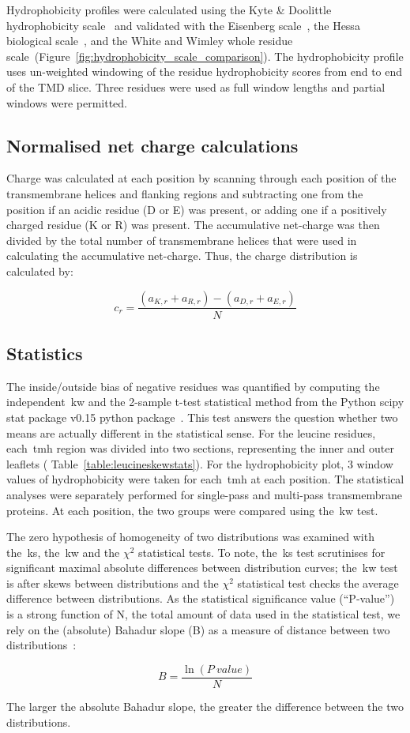 Hydrophobicity profiles were calculated using the Kyte \& Doolittle hydrophobicity scale~\cite{Kyte1982} and validated with the Eisenberg scale~\cite{Eisenberg1984}, the Hessa biological scale~\cite{Hessa2005}, and the White and Wimley whole residue scale~\cite{White1999}(Figure~\ref{fig:hydrophobicity_scale_comparison}).
The hydrophobicity profile uses un-weighted windowing of the residue hydrophobicity scores from end to end of the TMD slice.
Three residues were used as full window lengths and partial windows were permitted.

\subsection{Normalised net charge calculations}

Charge was calculated at each position by scanning through each position of the transmembrane helices and flanking regions and subtracting one from the position if an acidic residue (D or E) was present, or adding one if a positively charged residue (K or R) was present.
The accumulative net-charge  was then divided by the total number  of transmembrane helices that were used in calculating the accumulative net-charge.
Thus, the charge distribution is calculated by:

\begin{equation} \label{eq:charge_equation}
c_r=\frac{(a_{K,r}+a_{R,r})-(a_{D,r}+a_{E,r})}{N}
\end{equation}

\subsection{Statistics}

The inside/outside bias of negative residues was quantified by computing the independent~\gls{kw} and the 2-sample t-test statistical method from the Python scipy stat package v0.15 python package~\cite{VanderWalt2011}.
This test answers the question whether two means are actually different in the statistical sense.
For the leucine residues, each~\gls{tmh} region was divided into two sections, representing the inner and outer leaflets ( Table~\ref{table:leucineskewstats}).
 For the hydrophobicity plot, 3 window values of hydrophobicity were taken for each~\gls{tmh} at each position.
The statistical analyses were separately performed for single-pass and multi-pass transmembrane proteins.
At each position, the two groups were compared using the~\gls{kw} test.

The zero hypothesis of homogeneity of two distributions was examined with the~\gls{ks}, the~\gls{kw} and the \({\chi}^{2}\) statistical tests.
To note, the~\gls{ks} test scrutinises for significant maximal absolute differences between distribution curves; the~\gls{kw} test is after skews between distributions and the \({\chi}^{2}\) statistical test checks the average difference between distributions.
As the statistical significance value (``P‑value'') is a strong function of N, the total amount of data used in the statistical test, we rely on the (absolute) Bahadur slope (B) as a measure of distance between two distributions~\cite{Bahadur1967, Bahadur1971}:

\begin{equation} \label{eq:bahadur}
B=\frac{\ln(P~value)}{N}
\end{equation}

The larger the absolute Bahadur slope, the greater the difference between the two distributions.
